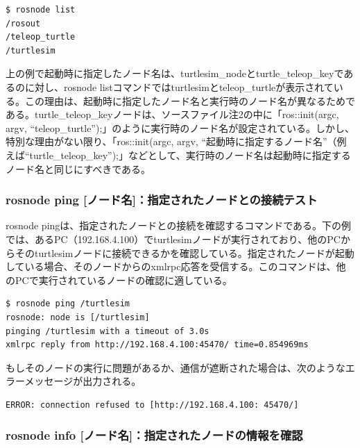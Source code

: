 \begin{lstlisting}[language=ROS]
$ rosnode list
/rosout
/teleop_turtle
/turtlesim
\end{lstlisting}

\begin{exercise}[起動時に指定するノード名と実行されたノード名が違う理由]
上の例で起動時に指定したノード名は、turtlesim\_nodeとturtle\_teleop\_keyであるのに対し、rosnode listコマンドではturtlesimとteleop\_turtleが表示されている。この理由は、起動時に指定したノード名と実行時のノード名が異なるためである。turtle\_teleop\_keyノードは、ソースファイル注2の中に「ros::init(argc, argv, ``teleop\_turtle'');」のように実行時のノード名が設定されている。しかし、特別な理由がない限り、「ros::init(argc, argv, ``起動時に指定するノード名''（例えば``turtle\_teleop\_key'');」などとして、実行時のノード名は起動時に指定するノード名と同じにすべきである。
\end{exercise}

\subsubsection{rosnode ping [ノード名]：指定されたノードとの接続テスト}

rosnode pingは、指定されたノードとの接続を確認するコマンドである。下の例では、あるPC（192.168.4.100）でturtlesimノードが実行されており、他のPCからそのturtlesimノードに接続できるかを確認している。指定されたノードが起動している場合、そのノードからのxmlrpc応答を受信する。このコマンドは、他のPCで実行されているノードの確認に適している。

\begin{lstlisting}[language=ROS]
$ rosnode ping /turtlesim
rosnode: node is [/turtlesim]
pinging /turtlesim with a timeout of 3.0s
xmlrpc reply from http://192.168.4.100:45470/ time=0.854969ms
\end{lstlisting}

もしそのノードの実行に問題があるか、通信が遮断された場合は、次のようなエラーメッセージが出力される。

\begin{lstlisting}[language=ROS]
ERROR: connection refused to [http://192.168.4.100: 45470/]
\end{lstlisting}

\subsubsection{rosnode info [ノード名]：指定されたノードの情報を確認}


